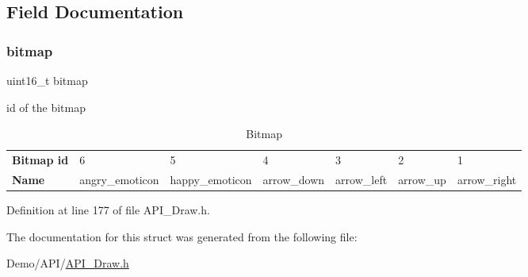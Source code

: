 \subsection{Field Documentation}
\mbox{\label{struct_b_i_t_m_a_p_a02b2be7b8ce086893453d390c5fdcf1d}} 
\subsubsection{\texorpdfstring{bitmap}{bitmap}}
{\footnotesize\ttfamily uint16\+\_\+t bitmap}



id of the bitmap 

\hypertarget{struct_b_i_t_m_a_p_Bitmap}{}
\tabulinesep=1mm
\begin{longtabu} spread 0pt [c]{*{7}{|X[-1]}|}
\caption{Bitmap}\label{struct_b_i_t_m_a_p_Bitmap}\\
\hline
\textbf{ Bitmap id }&6 &5 &4 &3 &2 &1  \\
{\bfseries Name} &angry\+\_\+emoticon &happy\+\_\+emoticon &arrow\+\_\+down &arrow\+\_\+left &arrow\+\_\+up &arrow\+\_\+right   \\
\end{longtabu}


Definition at line 177 of file A\+P\+I\+\_\+\+Draw.\+h.



The documentation for this struct was generated from the following file\+:\begin{DoxyCompactItemize}
\item 
Demo/\+A\+P\+I/\hyperlink{_a_p_i___draw_8h}{A\+P\+I\+\_\+\+Draw.\+h}\end{DoxyCompactItemize}
